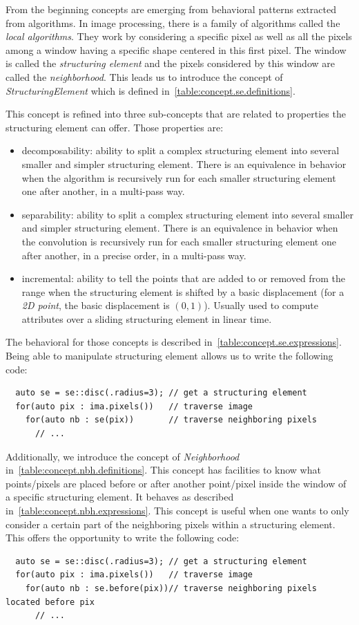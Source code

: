 From the beginning concepts are emerging from behavioral patterns extracted from algorithms. In image processing, there
is a family of algorithms called the \emph{local algorithms}. They work by considering a specific pixel as well as all
the pixels among a window having a specific shape centered in this first pixel. The window is called the
\emph{structuring element} and the pixels considered by this window are called the \emph{neighborhood}. This leads us to
introduce the concept of \emph{StructuringElement} which is defined in~\cref{table:concept.se.definitions}.

This concept is refined into three sub-concepts that are related to properties the structuring element can offer. Those
properties are:
\begin{itemize}
  \item decomposability: ability to split a complex structuring element into several smaller and simpler structuring
        element. There is an equivalence in behavior when the algorithm is recursively run for each smaller structuring
        element one after another, in a multi-pass way.
  \item separability: ability to split a complex structuring element into several smaller and simpler structuring
        element. There is an equivalence in behavior when the convolution is recursively run for each smaller
        structuring element one after another, in a precise order, in a multi-pass way.
  \item incremental: ability to tell the points that are added to or removed from the range when the structuring element
        is shifted by a basic displacement (\eg for a \emph{2D point}, the basic displacement is \((0,1)\)). Usually
        used to compute attributes over a sliding structuring element in linear time.
\end{itemize}


The behavioral for those concepts is described in~\cref{table:concept.se.expressions}. Being able to manipulate
structuring element allows us to write the following code:
\begin{verbatim}
  auto se = se::disc(.radius=3); // get a structuring element
  for(auto pix : ima.pixels())   // traverse image
    for(auto nb : se(pix))       // traverse neighboring pixels
      // ...
\end{verbatim}

Additionally, we introduce the concept of \emph{Neighborhood} in~\cref{table:concept.nbh.definitions}. This concept has
facilities to know what points/pixels are placed before or after another point/pixel inside the window of a specific
structuring element. It behaves as described in~\cref{table:concept.nbh.expressions}. This concept is useful when one
wants to only consider a certain part of the neighboring pixels within a structuring element. This offers the
opportunity to write the following code:
\begin{verbatim}
  auto se = se::disc(.radius=3); // get a structuring element
  for(auto pix : ima.pixels())   // traverse image
    for(auto nb : se.before(pix))// traverse neighboring pixels located before pix
      // ...
\end{verbatim}

